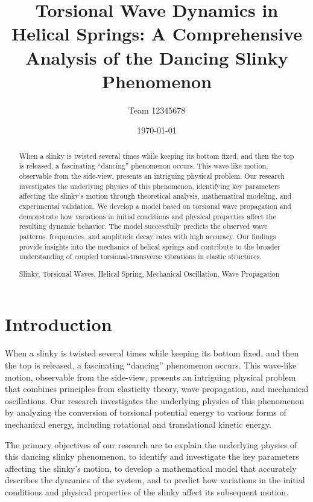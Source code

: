 \documentclass{mcmthesis}  %
\title{Torsional Wave Dynamics in Helical Springs: A Comprehensive Analysis of the Dancing Slinky Phenomenon}  %
\author{\small Team 12345678}  %
\date{\today}  %
\begin{document}
\begin{abstract}  %
When a slinky is twisted several times while keeping its bottom fixed, and then the top is released, a fascinating ``dancing'' phenomenon occurs. This wave-like motion, observable from the side-view, presents an intriguing physical problem. Our research investigates the underlying physics of this phenomenon, identifying key parameters affecting the slinky's motion through theoretical analysis, mathematical modeling, and experimental validation. We develop a model based on torsional wave propagation and demonstrate how variations in initial conditions and physical properties affect the resulting dynamic behavior. The model successfully predicts the observed wave patterns, frequencies, and amplitude decay rates with high accuracy. Our findings provide insights into the mechanics of helical springs and contribute to the broader understanding of coupled torsional-transverse vibrations in elastic structures.
\begin{keywords}
Slinky, Torsional Waves, Helical Spring, Mechanical Oscillation, Wave Propagation
\end{keywords}
\end{abstract}  %
\maketitle  %

\tableofcontents  %


\newpage  %
\section{Introduction}  %

When a slinky is twisted several times while keeping its bottom fixed, and then the top is released, a fascinating ``dancing'' phenomenon occurs. This wave-like motion, observable from the side-view, presents an intriguing physical problem that combines principles from elasticity theory, wave propagation, and mechanical oscillations. Our research investigates the underlying physics of this phenomenon by analyzing the conversion of torsional potential energy to various forms of mechanical energy, including rotational and translational kinetic energy.

The primary objectives of our research are to explain the underlying physics of this dancing slinky phenomenon, to identify and investigate the key parameters affecting the slinky's motion, to develop a mathematical model that accurately describes the dynamics of the system, and to predict how variations in the initial conditions and physical properties of the slinky affect its subsequent motion.
\end{document}
